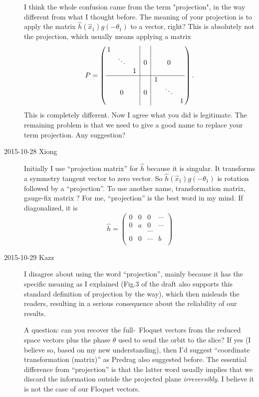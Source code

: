 \begin{description}
I think the whole confusion came from the term "projection", in the way different from what I thought before. The meaning of your projection is to apply the matrix $\hat{h}(\hat{x}_1)g(-\theta_1)$ to a vector, right? This is absolutely not the projection, which usually means applying a matrix
\begin{equation}
 P = \left( \begin{array}{@{\,}ccc|c|ccc@{\,}}
 1 &        &   &   &   &        & \\
   & \ddots &   & 0 &   &    0   & \\
   &        & 1 &   &   &        & \\ \hline
   &        &   &   & 1 &        & \\
   &    0   &   & 0 &   & \ddots & \\
   &        &   &   &   &        & 1 \end{array} \right).
\end{equation}
This is completely different. Now I agree what you did is legitimate. The remaining problem is that we need to give a good name to replace your term projection. Any suggestion?

\item[2015-10-28 Xiong]
Initially I use ``projection matrix'' for  $\hat{h}$
because it is singular. It transforms a symmetry tangent vector
to zero vector. So
$\hat{h}(\hat{x}_1)g(-\theta_1)$ is rotation followed by a ``projection''.
To use another name, transformation matrix, gauge-fix matrix ?
For me, ``projection'' is the best word in my mind.
If diagonalized, it is
\begin{equation}
  \hat{h} =
  \begin{pmatrix}
    0 & 0 & 0 & \cdots \\
    0 & a & 0 & \cdots \\
    & & \cdots &  \\
    0 & 0 & \cdots & b \\
  \end{pmatrix}
\end{equation}

\item[2015-10-29 Kazz]
I disagree about using the word ``projection'', mainly because it has the
specific meaning as I explained (Fig.3 of the draft also supports this
standard definition of projection by the way), which then misleads the
readers, resulting in a serious consequence about the reliability of our
results.

A question: can you recover the full-\statesp\ Floquet vectors from the
reduced space vectors plus the phase $\theta$ used to send the orbit to
the slice? If yes (I believe so, based on my new understanding), then I'd
suggest ``coordinate transformation (matrix)'' as Predrag also suggested
before. The essential difference from ``projection'' is that the latter
word usually implies that we discard the information outside the
projected plane \textit{irreversibly}. I believe it is not the case of
our Floquet vectors.


\end{description}
